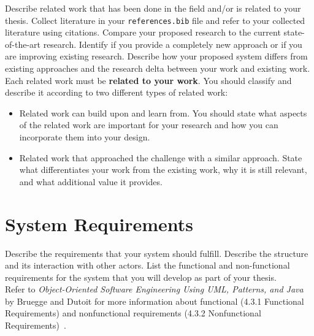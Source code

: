 \begin{tcolorbox}[breakable]
	Describe related work that has been done in the field and/or is related to your thesis. 
	Collect literature in your \texttt{references.bib} file and refer to your collected literature using citations. 
	Compare your proposed research to the current state-of-the-art research.
	Identify if you provide a completely new approach or if you are improving existing research. 
	Describe how your proposed system differs from existing approaches and the research delta between your work and existing work.
	\\
	Each related work must be \textbf{related to your work}.
	You should classify and describe it according to two different types of related work:
	\begin{itemize}
		\item Related work can build upon and learn from. You should state what aspects of the related work are important for your research and how you can incorporate them into your design.
		\item Related work that approached the challenge with a similar approach. State what differentiates your work from the existing work, why it is still relevant, and what additional value it provides.	
	\end{itemize}
\end{tcolorbox}

\section*{System Requirements}

\begin{tcolorbox}[breakable]
	Describe the requirements that your system should fulfill. 
	Describe the structure and its interaction with other actors. 
	List the functional and non-functional requirements for the system that you will develop as part of your thesis. 
	\\
	Refer to \textit{Object-Oriented Software Engineering Using UML, Patterns, and Java} by Bruegge and Dutoit for more information about functional (4.3.1 Functional Requirements) and nonfunctional requirements (4.3.2 Nonfunctional Requirements)~\cite{bruegge2013object}.
\end{tcolorbox}

